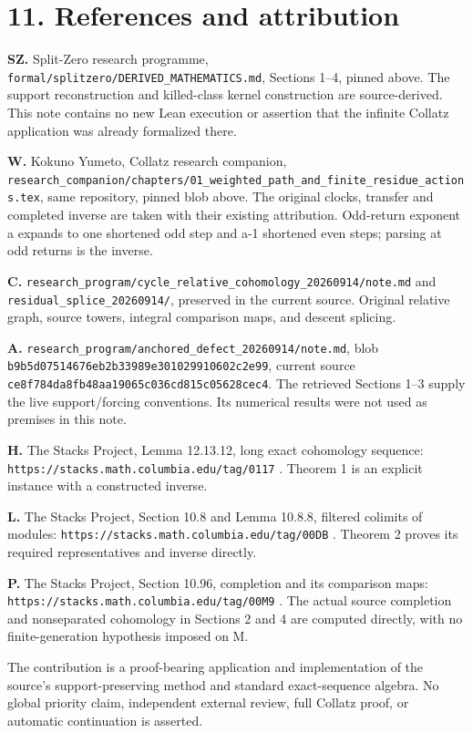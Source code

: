 \section{11. References and attribution}

\textbf{SZ.} Split-Zero research programme,
\nolinkurl{formal/splitzero/DERIVED_MATHEMATICS.md}, Sections 1--4,
pinned above. The support reconstruction and killed-class kernel
construction are source-derived. This note contains no new Lean
execution or assertion that the infinite Collatz application was already
formalized there.

\textbf{W.} Kokuno Yumeto, Collatz research companion,
\nolinkurl{research_companion/chapters/01_weighted_path_and_finite_residue_actions.tex},
same repository, pinned blob above. The original clocks, transfer and
completed inverse are taken with their existing attribution. Odd-return
exponent a expands to one shortened odd step and a-1 shortened even
steps; parsing at odd returns is the inverse.

\textbf{C.}
\nolinkurl{research_program/cycle_relative_cohomology_20260914/note.md}
and \nolinkurl{residual_splice_20260914/}, preserved in the current
source. Original relative graph, source towers, integral comparison
maps, and descent splicing.

\textbf{A.}
\nolinkurl{research_program/anchored_defect_20260914/note.md}, blob
\nolinkurl{b9b5d07514676eb2b33989e301029910602c2e99}, current source
\nolinkurl{ce8f784da8fb48aa19065c036cd815c05628cec4}. The retrieved
Sections 1--3 supply the live support/forcing conventions. Its numerical
results were not used as premises in this note.

\textbf{H.} The Stacks Project, Lemma 12.13.12, long exact cohomology
sequence: \nolinkurl{https://stacks.math.columbia.edu/tag/0117} .
Theorem 1 is an explicit instance with a constructed inverse.

\textbf{L.} The Stacks Project, Section 10.8 and Lemma 10.8.8, filtered
colimits of modules:
\nolinkurl{https://stacks.math.columbia.edu/tag/00DB} . Theorem 2 proves
its required representatives and inverse directly.

\textbf{P.} The Stacks Project, Section 10.96, completion and its
comparison maps: \nolinkurl{https://stacks.math.columbia.edu/tag/00M9} .
The actual source completion and nonseparated cohomology in Sections 2
and 4 are computed directly, with no finite-generation hypothesis
imposed on M.

The contribution is a proof-bearing application and implementation of
the source's support-preserving method and standard exact-sequence
algebra. No global priority claim, independent external review, full
Collatz proof, or automatic continuation is asserted.
